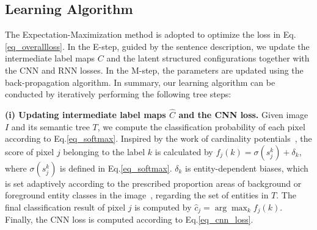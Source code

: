 \documentclass[10pt,twocolumn,letterpaper]{article}
\begin{document}
\subsection{Learning Algorithm} \label{sub:em_learning}

The Expectation-Maximization method is adopted to optimize the loss in Eq.\eqref{eq_overallloss}. In the E-step, guided by the sentence description, we update the intermediate label maps $C$ and the latent structured configurations together with the CNN and RNN losses. In the M-step, the parameters are updated using the back-propagation algorithm. In summary, our learning algorithm can be conducted by iteratively performing the following tree steps:


\textbf{(i) Updating intermediate label maps $\hat{C}$ and the CNN loss.} Given image $I$ and its semantic tree $T$, we compute the classification probability of each pixel according to Eq.\eqref{eq_softmax}. Inspired by the work of cardinality potentials~\cite{DBLP:conf/uai/TarlowSZAF12}\cite{DBLP:conf/icml/LiZ14}, the score of pixel $j$ belonging to the label $k$ is calculated by $f_j(k) = \sigma(s_j^k)+\delta_k$, where $\sigma(s_j^k)$ is defined in Eq.\eqref{eq_softmax}. $\delta_k$ is entity-dependent biases, which is set adaptively according to the prescribed proportion areas of background or foreground entity classes in the image~\cite{DBLP:WeaklySegmentation}, regarding the set of entities in $T$. The final classification result of pixel $j$ is computed by $\widehat{c}_j=\arg\max_k f_j(k)$. Finally, the CNN loss is computed according to Eq.\eqref{eq_cnn_loss}.
\end{document}
